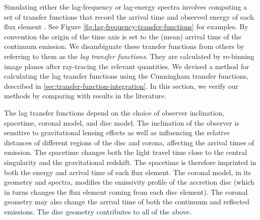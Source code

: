 \documentclass[fleqn,usenatbib]{mnras}
\begin{document}
Simulating either the lag-frequency or lag-energy spectra involves computing a
set of transfer functions that record the arrival time and observed energy of
each flux element \citep{reynolds_x-ray_1999}. See Figure
\ref{fig:lag-frequency-transfer-functions} for examples. By convention the
origin of the time axis is set to the (mean) arrival time of the continuum
emission. We disambiguate these transfer functions from others by referring to
them as the \textit{lag transfer functions}. They are calculated by re-binning
image planes after ray-tracing the relevant quantities. We devised a method for
calculating the lag transfer functions using the Cunningham transfer functions,
described in \ref{sec:transfer-function-integration}. In this section, we verify
our methods by comparing with results in the literature.

The lag transfer functions depend on the choice of observer inclination,
spacetime, coronal model, and disc model. The inclination of the observer is
sensitive to gravitational lensing effects as well as influencing the relative
distances of different regions of the disc and corona, affecting the arrival
times of emission. The spacetime changes both the light travel time close to the
central singularity and the gravitational redshift. The spacetime is therefore
imprinted in both the energy and arrival time of each flux element.  The coronal
model, in its geometry and spectra, modifies the emissivity profile of the
accretion disc (which in turns changes the flux element coming from each disc
element). The coronal geometry may also change the arrival time of both the
continuum and reflected emissions. The disc geometry contributes to all of the
above.

\end{document}

